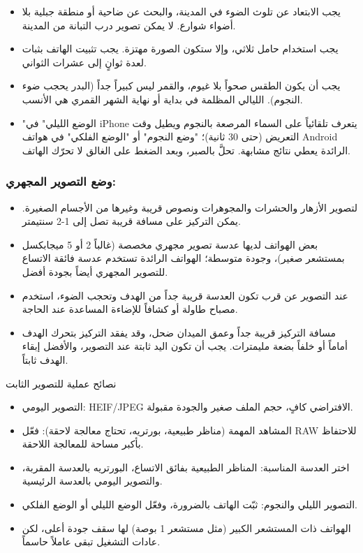 \begin{itemize}
  \item يجب الابتعاد عن تلوث الضوء في المدينة، والبحث عن ضاحية أو منطقة جبلية بلا أضواء شوارع. لا يمكن تصوير درب التبانة من المدينة.
  \item يجب استخدام حامل ثلاثي، وإلا ستكون الصورة مهتزة. يجب تثبيت الهاتف بثبات لعدة ثوانٍ إلى عشرات الثواني.
  \item يجب أن يكون الطقس صحواً بلا غيوم، والقمر ليس كبيراً جداً (البدر يحجب ضوء النجوم). الليالي المظلمة في بداية أو نهاية الشهر القمري هي الأنسب.
  \item "الوضع الليلي" في iPhone يتعرف تلقائياً على السماء المرصعة بالنجوم ويطيل وقت التعريض (حتى 30 ثانية)؛ "وضع النجوم" أو "الوضع الفلكي" في هواتف Android الرائدة يعطي نتائج مشابهة. تحلَّ بالصبر، وبعد الضغط على الغالق لا تحرّك الهاتف.
\end{itemize}

\subsubsection*{وضع التصوير المجهري:}

\begin{itemize}
  \item لتصوير الأزهار والحشرات والمجوهرات ونصوص قريبة وغيرها من الأجسام الصغيرة. يمكن التركيز على مسافة قريبة تصل إلى 1-2 سنتيمتر.
  \item بعض الهواتف لديها عدسة تصوير مجهري مخصصة (غالباً 2 أو 5 ميجابكسل بمستشعر صغير)، وجودة متوسطة؛ الهواتف الرائدة تستخدم عدسة فائقة الاتساع للتصوير المجهري أيضاً بجودة أفضل.
  \item عند التصوير عن قرب تكون العدسة قريبة جداً من الهدف وتحجب الضوء، استخدم مصباح طاولة أو كشافاً للإضاءة المساعدة عند الحاجة.
  \item مسافة التركيز قريبة جداً وعمق الميدان ضحل، وقد يفقد التركيز بتحرك الهدف أماماً أو خلفاً بضعة مليمترات. يجب أن تكون اليد ثابتة عند التصوير، والأفضل إبقاء الهدف ثابتاً.
\end{itemize}

\begin{tcbinfo}{نصائح عملية للتصوير الثابت}
\begin{itemize}
  \item التصوير اليومي: HEIF/JPEG الافتراضي كافٍ، حجم الملف صغير والجودة مقبولة.
  \item المشاهد المهمة (مناظر طبيعية، بورتريه، تحتاج معالجة لاحقة): فعّل RAW للاحتفاظ بأكبر مساحة للمعالجة اللاحقة.
  \item اختر العدسة المناسبة: المناظر الطبيعية بفائق الاتساع، البورتريه بالعدسة المقربة، والتصوير اليومي بالعدسة الرئيسية.
  \item التصوير الليلي والنجوم: ثبّت الهاتف بالضرورة، وفعّل الوضع الليلي أو الوضع الفلكي.
  \item الهواتف ذات المستشعر الكبير (مثل مستشعر 1 بوصة) لها سقف جودة أعلى، لكن عادات التشغيل تبقى عاملاً حاسماً.
\end{itemize}

\end{tcbinfo}

